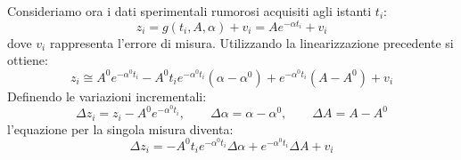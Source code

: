 Consideriamo ora i dati sperimentali rumorosi acquisiti agli istanti $t_{i}$:
\begin{equation}
z_{i} = g(t_{i}, A, \alpha) + v_{i} = A e^{-\alpha t_{i}} + v_{i}
\end{equation}
dove $v_{i}$ rappresenta l'errore di misura. Utilizzando la linearizzazione precedente si ottiene:
\begin{equation}
z_{i} \cong A^{0} e^{-\alpha^{0} t_{i}} - A^{0} t_{i} e^{-\alpha^{0} t_{i}} (\alpha - \alpha^{0}) + e^{-\alpha^{0} t_{i}} (A - A^{0}) + v_{i}
\end{equation}
Definendo le variazioni incrementali:
\begin{equation}
\Delta z_{i} = z_{i} - A^{0} e^{-\alpha^{0} t_{i}}, \qquad \Delta\alpha = \alpha - \alpha^{0}, \qquad \Delta A = A - A^{0}
\end{equation}
l'equazione per la singola misura diventa:
\begin{equation}
\Delta z_{i} = -A^{0} t_{i} e^{-\alpha^{0} t_{i}} \Delta\alpha + e^{-\alpha^{0} t_{i}} \Delta A + v_{i}
\end{equation}

